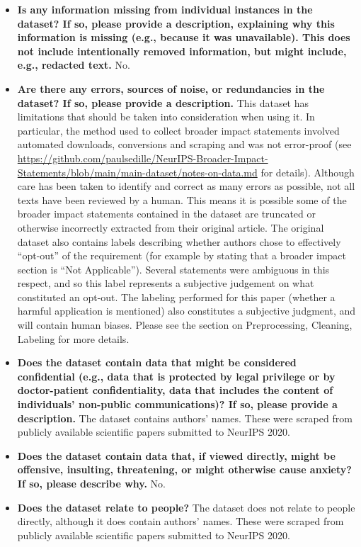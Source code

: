 \documentclass{article}
\begin{document}
\begin{itemize}
    \item \textbf{Is any information missing from individual instances in the dataset? If so, please provide a description, explaining why this information is missing (e.g., because it was unavailable). This does not include intentionally removed information, but might include, e.g., redacted text.} No.
    \item \textbf{Are there any errors, sources of noise, or redundancies in the dataset? If so, please provide a description.} This dataset has limitations that should be taken into consideration when using it. In particular, the method used to collect broader impact statements involved automated downloads, conversions and scraping and was not error-proof (see \href{https://github.com/paulsedille/NeurIPS-Broader-Impact-Statements/blob/main/main-dataset/notes-on-data.md}{https://github.com/paulsedille/NeurIPS-Broader-Impact-Statements/blob/main/main-dataset/notes-on-data.md} for details). Although care has been taken to identify and correct as many errors as possible, not all texts have been reviewed by a human. This means it is possible some of the broader impact statements contained in the dataset are truncated or otherwise incorrectly extracted from their original article. The original dataset also contains labels describing whether authors chose to effectively ``opt-out'' of the requirement (for example by stating that a broader impact section is ``Not Applicable''). Several statements were ambiguous in this respect, and so this label represents a subjective judgement on what constituted an opt-out. The labeling performed for this paper (whether a harmful application is mentioned) also constitutes a subjective judgment, and will contain human biases. Please see the section on Preprocessing, Cleaning, Labeling for more details. 
    \item \textbf{Does the dataset contain data that might be considered confidential (e.g., data that is protected by legal privilege or by doctor-patient confidentiality, data that includes the content of individuals’ non-public communications)? If so, please provide a description.} The dataset contains authors' names. These were scraped from publicly available scientific papers submitted to NeurIPS 2020.
    \item \textbf{Does the dataset contain data that, if viewed directly, might be offensive, insulting, threatening, or might otherwise cause anxiety? If so, please describe why.} No.
    \item \textbf{Does the dataset relate to people?} The dataset does not relate to people directly, although it does contain authors' names. These were scraped from publicly available scientific papers submitted to NeurIPS 2020.
\end{itemize}
\end{document}
